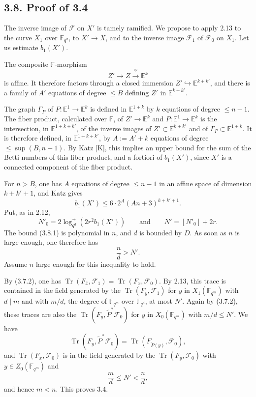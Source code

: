 \documentclass[11pt]{article}
\newcommand{\F}{\mathbb{F}}
\newcommand{\Tr}{\operatorname{Tr}}
\begin{document}
\subsection*{3.8. Proof of 3.4}
The inverse image of $\mathcal F$ on $X'$ is tamely ramified.
We propose to apply 2.13 to the curve $X_1$ over $\F_{q^d}$, to $X'\to X$, and to the inverse image $\mathcal F_1$ of $\mathcal F_0$ on $X_1$.
Let us estimate $b_1(X')$.

The composite $\F$-morphism
\[
 Z'\to Z\xrightarrow{\varphi}\mathbb E^k
\]
is affine.
It therefore factors through a closed immersion $Z'\hookrightarrow\mathbb E^{k+k'}$, and there is a family of $A'$ equations of degree $\le B$ defining $Z'$ in $\mathbb E^{k+k'}$.

The graph $\Gamma_P$ of $P:\mathbb E^1\to\mathbb E^k$ is defined in $\mathbb E^{1+k}$ by $k$ equations of degree $\le n-1$.
The fiber product, calculated over $\F$, of $Z'\to\mathbb E^k$ and $P:\mathbb E^1\to\mathbb E^k$ is the intersection, in $\mathbb E^{1+k+k'}$, of the inverse images of $Z'\subset\mathbb E^{k+k'}$ and of $\Gamma_P\subset\mathbb E^{1+k}$.
It is therefore defined, in $\mathbb E^{1+k+k'}$, by $A:=A'+k$ equations of degree $\le\sup(B,n-1)$.
By Katz [K], this implies an upper bound for the sum of the Betti numbers of this fiber product, and a fortiori of $b_1(X')$, since $X'$ is a connected component of the fiber product.

For $n>B$, one has $A$ equations of degree $\le n-1$ in an affine space of dimension $k+k'+1$, and Katz gives
\begin{equation}
 b_1(X')\le 6\cdot 2^A(An+3)^{k+k'+1}.
\tag{3.8.1}
\end{equation}
Put, as in 2.12,
\[
 N'_0=2\log_{q^d}^+(2r^2b_1(X'))\qquad\text{and}\qquad
 N'=[N'_0]+2r.
\]
The bound (3.8.1) is polynomial in $n$, and $d$ is bounded by $D$.
As soon as $n$ is large enough, one therefore has
\[
 \frac nd>N'.
\]
Assume $n$ large enough for this inequality to hold.

By (3.7.2), one has $\Tr(F_{\bar x},\mathcal F_1)=\Tr(F_x,\mathcal F_0)$.
By 2.13, this trace is contained in the field generated by the $\Tr(F_y,\mathcal F_1)$ for $y$ in $X_1(\F_{q^m})$ with $d\mid m$ and with $m/d$, the degree of $\F_{q^m}$ over $\F_{q^d}$, at most $N'$.
Again by (3.7.2), these traces are also the $\Tr(F_y,\widetilde P^*\mathcal F_0)$ for $y$ in $X_0(\F_{q^m})$ with $m/d\le N'$.
We have
\[
 \Tr(F_y,\widetilde P^*\mathcal F_0)=\Tr(F_{\widetilde P(y)},\mathcal F_0),
\]
and $\Tr(F_x,\mathcal F_0)$ is in the field generated by the $\Tr(F_y,\mathcal F_0)$ with $y\in Z_0(\F_{q^m})$ and
\[
 \frac md\le N'<\frac nd,
\]
and hence $m<n$.
This proves 3.4.
\end{document}
